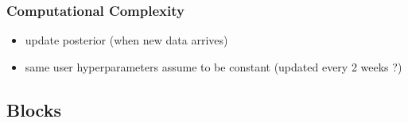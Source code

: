 \documentclass[
	8pt, %
]{beamer}
\begin{document}
\begin{frame}
	\frametitle{Computational Complexity}

	\begin{itemize}
		\item update posterior (when new data arrives)
		\item same user hyperparameters assume to be constant (updated every 2 weeks ?)
	\end{itemize}

\end{frame}
%
%
%
%
%

\subsection{Blocks}
\end{document}
